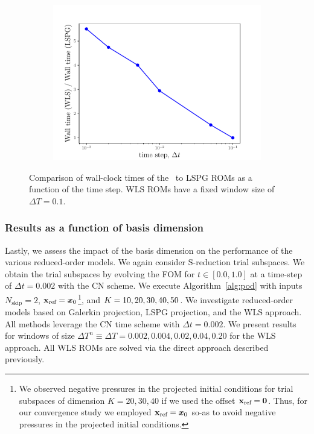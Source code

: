 \begin{figure}
\begin{center}
\begin{subfigure}[t]{0.45\textwidth}
\includegraphics[width=1.\linewidth]{figs/sod/walltime_vs_window_dtvar.pdf}
\label{fig:sod_error_a}
\end{subfigure}
\caption{Comparison of wall-clock times of the \methodAcronymROMs\ to LSPG ROMs as a function of the time step. WLS ROMs have a fixed window size of $\Delta T = 0.1$.} 
\label{fig:walltime_dtvar}
\end{center}
\end{figure}


\subsubsection{Results as a function of basis dimension}
Lastly, we assess the impact of the basis dimension on the performance of the various reduced-order models. We again consider S-reduction trial subspaces. We obtain the trial subspaces by evolving the FOM for $t \in [0.0,1.0]$ at a time-step of $\Delta t = 0.002$ with the CN scheme. We execute Algorithm~\ref{alg:pod} with inputs $N_{\text{skip}} = 2$, $\mathbf{x}_\text{ref} = \boldsymbol x_0$\footnote{We observed negative pressures in the projected initial conditions for trial subspaces of dimension $K=20,30,40$ if we used the offset $\mathbf{x}_\text{ref} = \boldsymbol 0$. Thus, for our convergence study we employed $\mathbf{x}_\text{ref} = \boldsymbol x_0$ so-as to avoid negative pressures in the projected initial conditions.}, and $K = 10,20,30,40,50$. We investigate reduced-order models based on Galerkin projection, LSPG projection, and the WLS approach. All methods leverage the CN time scheme with $\Delta t = 0.002$. We present results for windows of size $\Delta T^n \equiv \Delta T = 0.002,0.004,0.02,0.04,0.20$ for the WLS approach. All WLS ROMs are solved via the direct approach described previously. 

